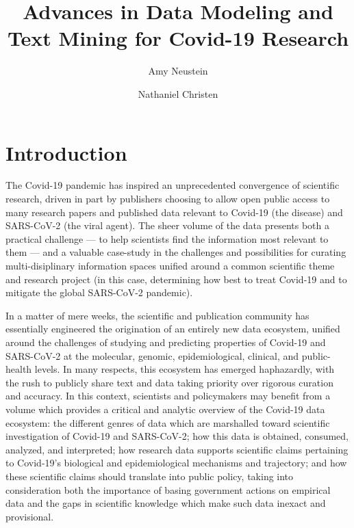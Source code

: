 \documentclass{statsoc}
\title[Short title]{Advances in Data Modeling and Text Mining for Covid-19 Research}
\author[Amy Neustein]{Amy Neustein}
\author[Nathaniel Christen]{Nathaniel Christen}
\begin{document}


\section{Introduction}

The Covid-19 pandemic has inspired an unprecedented 
convergence of scientific research, driven in part 
by publishers choosing to allow open public access 
to many research papers and published data 
relevant to Covid-19 (the disease) and SARS-CoV-2 
(the viral agent).  The sheer volume of the data 
presents both a practical challenge --- to help 
scientists find the information most relevant to them 
--- and a valuable case-study in the challenges and 
possibilities for curating multi-disiplinary 
information spaces unified around a common 
scientific theme and research project (in this case, 
determining how best to treat Covid-19 and to 
mitigate the global SARS-CoV-2 pandemic).  

In a matter of mere weeks, the scientific and publication 
community has essentially engineered the origination of 
an entirely new data ecosystem, unified around the 
challenges of studying and predicting properties 
of Covid-19 and SARS-CoV-2 at the molecular, genomic, 
epidemiological, clinical, and public-health levels.  
In many respects, this ecosystem has emerged 
haphazardly, with the rush to publicly share 
text and data taking priority over rigorous 
curation and accuracy.  In this context, 
scientists and policymakers may benefit from a 
volume which provides a critical and analytic 
overview of the Covid-19 data ecosystem: the 
different genres of data which are marshalled 
toward scientific investigation of Covid-19 
and SARS-CoV-2; how this data is obtained, 
consumed, analyzed, and interpreted; how 
research data supports scientific claims 
pertaining to Covid-19's biological and 
epidemiological mechanisms and trajectory; 
and how these scientific claims should 
translate into public policy, taking into 
consideration both the importance of 
basing government actions on empirical data and 
the gaps in scientific knowledge which make 
such data inexact and provisional. 
\end{document}
